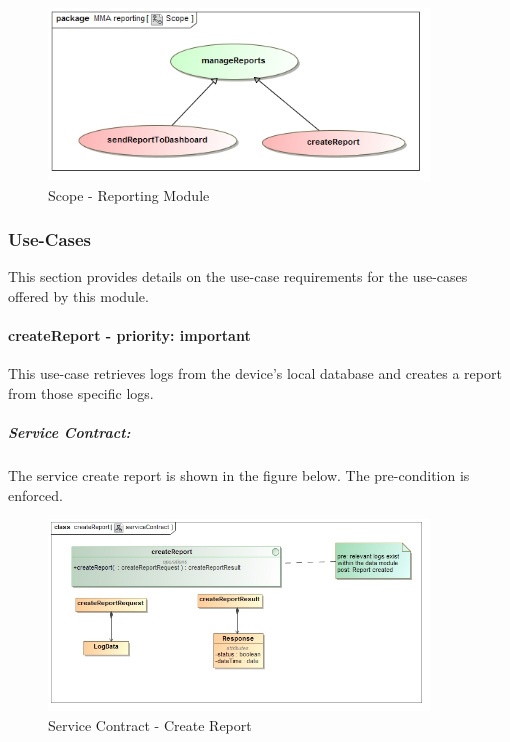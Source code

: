 \documentclass[hidelinks, 12pt, oneside]{article}
\begin{document}
	
	\begin{figure}[!htbp]
    		\centering
    		\includegraphics[width=0.9\textwidth]{img/scopeReports.jpg}
    		\caption{Scope - Reporting Module}
    		\label{fig:Scope_reportingModule}
		\end{figure}
			
		
	\subsubsection{Use-Cases}
			This section provides details on the use-case requirements for the use-cases offered by this module.
		\paragraph{ createReport - priority: important}
		This use-case retrieves logs from the device's local database and creates a report from those specific logs.
		\newpage
		
		\subparagraph{Service Contract:}
					The service create report is shown in the figure below. The pre-condition is enforced. 
					
				
		\begin{figure}[!htbp]
    		\centering
    		\includegraphics[width=0.9\textwidth]{img/serviceContractcreateReport.jpg}
    		\caption{Service Contract - Create Report}
    		\label{fig:ServiceCon_createReport}
		\end{figure}
		
\end{document}
